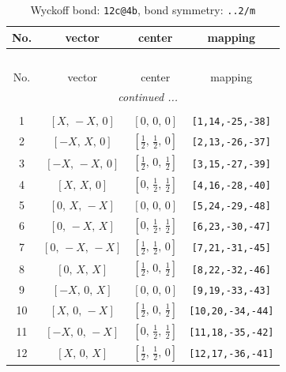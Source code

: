 \documentclass[fleqn,8pt]{jsarticle}
\begin{document}
\renewcommand{\arraystretch}{1.2}
\begin{longtable}{cccc}
\caption{Wyckoff bond: {\tt 12c@4b}, bond symmetry: {\tt ..2/m}}
 \\
 \hline \hline
No. & vector & center & mapping \\ \hline \endfirsthead

\multicolumn{3}{l}{\tablename\ \thetable{}} \\
 \hline \hline
No. & vector & center & mapping \\ \hline \endhead

 \hline \hline
\multicolumn{3}{r}{\footnotesize\it continued ...} \\ \endfoot

 \hline \hline
\multicolumn{3}{r}{} \\ \endlastfoot

1 & $\left[ X,\, - X,\, 0 \right]$ & $\left[ 0,\, 0,\, 0 \right]$ & {\tt [1,14,-25,-38]} \\ \hline
2 & $\left[ - X,\, X,\, 0 \right]$ & $\left[ \frac{1}{2},\, \frac{1}{2},\, 0 \right]$ & {\tt [2,13,-26,-37]} \\ \hline
3 & $\left[ - X,\, - X,\, 0 \right]$ & $\left[ \frac{1}{2},\, 0,\, \frac{1}{2} \right]$ & {\tt [3,15,-27,-39]} \\ \hline
4 & $\left[ X,\, X,\, 0 \right]$ & $\left[ 0,\, \frac{1}{2},\, \frac{1}{2} \right]$ & {\tt [4,16,-28,-40]} \\ \hline
5 & $\left[ 0,\, X,\, - X \right]$ & $\left[ 0,\, 0,\, 0 \right]$ & {\tt [5,24,-29,-48]} \\ \hline
6 & $\left[ 0,\, - X,\, X \right]$ & $\left[ 0,\, \frac{1}{2},\, \frac{1}{2} \right]$ & {\tt [6,23,-30,-47]} \\ \hline
7 & $\left[ 0,\, - X,\, - X \right]$ & $\left[ \frac{1}{2},\, \frac{1}{2},\, 0 \right]$ & {\tt [7,21,-31,-45]} \\ \hline
8 & $\left[ 0,\, X,\, X \right]$ & $\left[ \frac{1}{2},\, 0,\, \frac{1}{2} \right]$ & {\tt [8,22,-32,-46]} \\ \hline
9 & $\left[ - X,\, 0,\, X \right]$ & $\left[ 0,\, 0,\, 0 \right]$ & {\tt [9,19,-33,-43]} \\ \hline
10 & $\left[ X,\, 0,\, - X \right]$ & $\left[ \frac{1}{2},\, 0,\, \frac{1}{2} \right]$ & {\tt [10,20,-34,-44]} \\ \hline
11 & $\left[ - X,\, 0,\, - X \right]$ & $\left[ 0,\, \frac{1}{2},\, \frac{1}{2} \right]$ & {\tt [11,18,-35,-42]} \\ \hline
12 & $\left[ X,\, 0,\, X \right]$ & $\left[ \frac{1}{2},\, \frac{1}{2},\, 0 \right]$ & {\tt [12,17,-36,-41]} \\
\end{longtable}
\end{document}
